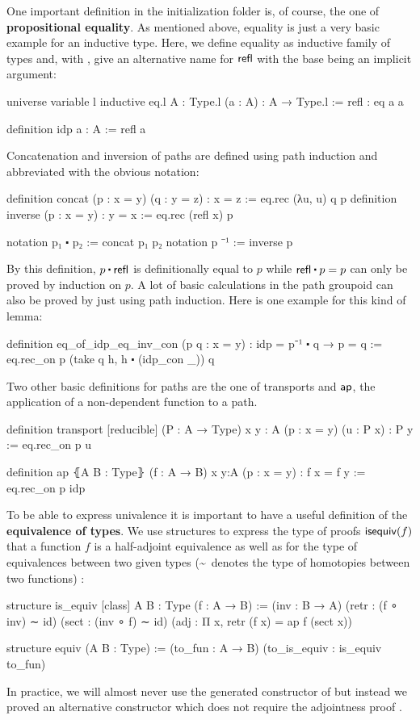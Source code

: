 One important definition in the initialization folder is, of course, the one of
\textbf{propositional equality}.
As mentioned above, equality is just a very basic example for an inductive type.
Here, we define equality  as inductive family of types and, with ,
give an alternative name for $\mathsf{refl}$ with the base being an implicit argument:
\begin{leancode}
universe variable l
inductive eq.{l} {A : Type.{l}} (a : A) : A → Type.{l} :=
refl : eq a a

definition idp {a : A} := refl a
\end{leancode}
Concatenation and inversion of paths are defined using path induction and abbreviated
with the obvious notation:
\begin{leancode}
definition concat (p : x = y) (q : y = z) : x = z := eq.rec (λu, u) q p
definition inverse (p : x = y) : y = x := eq.rec (refl x) p

notation p₁ ⬝ p₂ := concat p₁ p₂
notation p ⁻¹ := inverse p
\end{leancode}
By this definition, $p \ct \refl$ is definitionally equal to $p$ while $\refl \ct p = p$
can only be proved by induction on $p$.
A lot of basic calculations in the path groupoid can also be proved by just using
path induction. Here is one example for this kind of lemma:
\begin{leancode}
definition eq_of_idp_eq_inv_con (p q : x = y) : idp = p⁻¹ ⬝ q → p = q :=
eq.rec_on p (take q h, h ⬝ (idp_con _)) q
\end{leancode}
Two other basic definitions for paths are the one of transports and $\mathsf{ap}$, the
application of a non-dependent function to a path.
\begin{leancode}
definition transport [reducible] (P : A → Type) {x y : A}
  (p : x = y) (u : P x) : P y :=
eq.rec_on p u

definition ap ⦃A B : Type⦄ (f : A → B) {x y:A} (p : x = y) : f x = f y :=
eq.rec_on p idp
\end{leancode}

To be able to express univalence it is important to have a useful definition of
the \textbf{equivalence of types}.
We use structures to express the type of proofs $\mathsf{isequiv}(f)$ that a function $f$
is a half-adjoint equivalence as well as for the type of equivalences between
two given types (\textasciitilde \, denotes the type of homotopies between two functions) :
\begin{leancode}
structure is_equiv [class] {A B : Type} (f : A → B) :=
  (inv : B → A)
  (retr : (f ∘ inv) ∼ id)
  (sect : (inv ∘ f) ∼ id)
  (adj : Π x, retr (f x) = ap f (sect x))

structure equiv (A B : Type) :=
  (to_fun : A → B)
  (to_is_equiv : is_equiv to_fun)
\end{leancode}
In practice, we will almost never use the generated constructor of 
but instead we proved an alternative constructor  which does
not require the adjointness proof .

